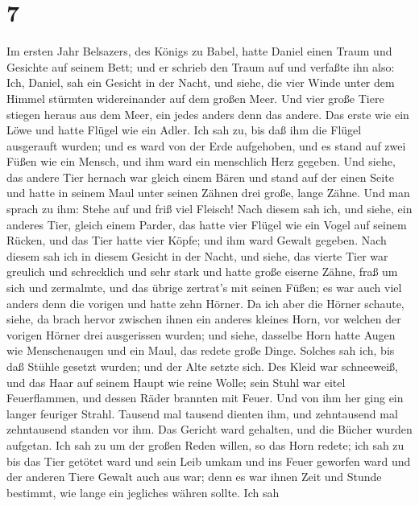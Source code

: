 \hypertarget{section-6}{%
\section{7}\label{section-6}}

 Im ersten Jahr Belsazers, des Königs zu Babel, hatte Daniel
einen Traum und Gesichte auf seinem Bett; und er schrieb den Traum auf
und verfaßte ihn also:  Ich, Daniel, sah ein Gesicht in der
Nacht, und siehe, die vier Winde unter dem Himmel stürmten widereinander
auf dem großen Meer.  Und vier große Tiere stiegen heraus
aus dem Meer, ein jedes anders denn das andere.  Das erste
wie ein Löwe und hatte Flügel wie ein Adler. Ich sah zu, bis daß ihm die
Flügel ausgerauft wurden; und es ward von der Erde aufgehoben, und es
stand auf zwei Füßen wie ein Mensch, und ihm ward ein menschlich Herz
gegeben.  Und siehe, das andere Tier hernach war gleich
einem Bären und stand auf der einen Seite und hatte in seinem Maul unter
seinen Zähnen drei große, lange Zähne. Und man sprach zu ihm: Stehe auf
und friß viel Fleisch!  Nach diesem sah ich, und siehe, ein
anderes Tier, gleich einem Parder, das hatte vier Flügel wie ein Vogel
auf seinem Rücken, und das Tier hatte vier Köpfe; und ihm ward Gewalt
gegeben.  Nach diesem sah ich in diesem Gesicht in der
Nacht, und siehe, das vierte Tier war greulich und schrecklich und sehr
stark und hatte große eiserne Zähne, fraß um sich und zermalmte, und das
übrige zertrat's mit seinen Füßen; es war auch viel anders denn die
vorigen und hatte zehn Hörner.  Da ich aber die Hörner
schaute, siehe, da brach hervor zwischen ihnen ein anderes kleines Horn,
vor welchen der vorigen Hörner drei ausgerissen wurden; und siehe,
dasselbe Horn hatte Augen wie Menschenaugen und ein Maul, das redete
große Dinge.  Solches sah ich, bis daß Stühle gesetzt
wurden; und der Alte setzte sich. Des Kleid war schneeweiß, und das Haar
auf seinem Haupt wie reine Wolle; sein Stuhl war eitel Feuerflammen, und
dessen Räder brannten mit Feuer.  Und von ihm her ging ein
langer feuriger Strahl. Tausend mal tausend dienten ihm, und zehntausend
mal zehntausend standen vor ihm. Das Gericht ward gehalten, und die
Bücher wurden aufgetan.  Ich sah zu um der großen Reden
willen, so das Horn redete; ich sah zu bis das Tier getötet ward und
sein Leib umkam und ins Feuer geworfen ward  und der
anderen Tiere Gewalt auch aus war; denn es war ihnen Zeit und Stunde
bestimmt, wie lange ein jegliches währen sollte.  Ich sah
